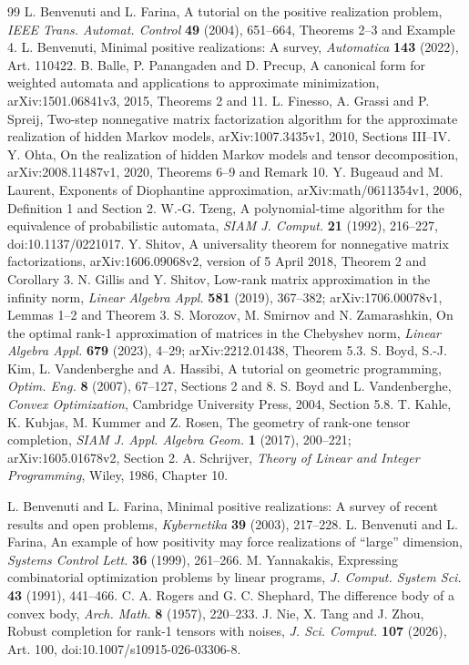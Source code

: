 \begin{thebibliography}{99}
 L. Benvenuti and L. Farina,
A tutorial on the positive realization problem,
\emph{IEEE Trans. Automat. Control} \textbf{49} (2004), 651--664,
Theorems 2--3 and Example 4.
 L. Benvenuti,
Minimal positive realizations: A survey,
\emph{Automatica} \textbf{143} (2022), Art. 110422.
 B. Balle, P. Panangaden and D. Precup,
A canonical form for weighted automata and applications to approximate minimization,
arXiv:1501.06841v3, 2015, Theorems 2 and 11.
 L. Finesso, A. Grassi and P. Spreij,
Two-step nonnegative matrix factorization algorithm for the approximate realization of hidden Markov models,
arXiv:1007.3435v1, 2010, Sections III--IV.
 Y. Ohta,
On the realization of hidden Markov models and tensor decomposition,
arXiv:2008.11487v1, 2020, Theorems 6--9 and Remark 10.
 Y. Bugeaud and M. Laurent,
Exponents of Diophantine approximation,
arXiv:math/0611354v1, 2006, Definition 1 and Section 2.
 W.-G. Tzeng,
A polynomial-time algorithm for the equivalence of probabilistic automata,
\emph{SIAM J. Comput.} \textbf{21} (1992), 216--227,
doi:10.1137/0221017.
 Y. Shitov,
A universality theorem for nonnegative matrix factorizations,
arXiv:1606.09068v2, version of 5 April 2018, Theorem 2 and Corollary 3.
 N. Gillis and Y. Shitov,
Low-rank matrix approximation in the infinity norm,
\emph{Linear Algebra Appl.} \textbf{581} (2019), 367--382;
arXiv:1706.00078v1, Lemmas 1--2 and Theorem 3.
 S. Morozov, M. Smirnov and N. Zamarashkin,
On the optimal rank-1 approximation of matrices in the Chebyshev norm,
\emph{Linear Algebra Appl.} \textbf{679} (2023), 4--29;
arXiv:2212.01438, Theorem 5.3.
 S. Boyd, S.-J. Kim, L. Vandenberghe and A. Hassibi,
A tutorial on geometric programming,
\emph{Optim. Eng.} \textbf{8} (2007), 67--127, Sections 2 and 8.
 S. Boyd and L. Vandenberghe,
\emph{Convex Optimization}, Cambridge University Press, 2004, Section 5.8.
 T. Kahle, K. Kubjas, M. Kummer and Z. Rosen,
The geometry of rank-one tensor completion,
\emph{SIAM J. Appl. Algebra Geom.} \textbf{1} (2017), 200--221;
arXiv:1605.01678v2, Section 2.
 A. Schrijver,
\emph{Theory of Linear and Integer Programming}, Wiley, 1986, Chapter 10.

 L. Benvenuti and L. Farina,
Minimal positive realizations: A survey of recent results and open problems,
\emph{Kybernetika} \textbf{39} (2003), 217--228.
 L. Benvenuti and L. Farina,
An example of how positivity may force realizations of ``large'' dimension,
\emph{Systems Control Lett.} \textbf{36} (1999), 261--266.
 M. Yannakakis,
Expressing combinatorial optimization problems by linear programs,
\emph{J. Comput. System Sci.} \textbf{43} (1991), 441--466.
 C. A. Rogers and G. C. Shephard,
The difference body of a convex body,
\emph{Arch. Math.} \textbf{8} (1957), 220--233.
 J. Nie, X. Tang and J. Zhou,
Robust completion for rank-1 tensors with noises,
\emph{J. Sci. Comput.} \textbf{107} (2026), Art. 100,
doi:10.1007/s10915-026-03306-8.

\end{thebibliography}
